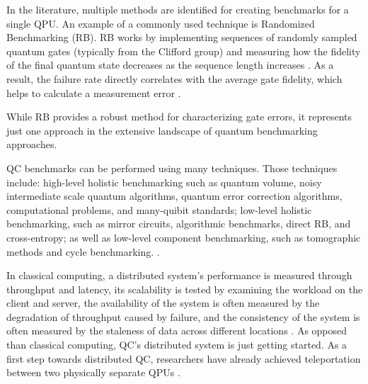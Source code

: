 
In the literature, multiple methods are identified for creating benchmarks for a single QPU. An example of a commonly used technique is Randomized Benchmarking (RB). RB works by implementing sequences of randomly sampled quantum gates (typically from the Clifford group) and measuring how the fidelity of the final quantum state decreases as the sequence length increases \cite{emersonScalableNoiseEstimation_2005}. As a result, the failure rate directly correlates with the average gate fidelity, which helps to calculate a measurement error \cite{magesanRobustRandomizedBenchmarking_2011}.

While RB provides a robust method for characterizing gate errors, it represents just one approach in the extensive landscape of quantum benchmarking approaches.

QC benchmarks can be performed using many techniques. Those techniques include: high-level holistic benchmarking such as quantum volume, noisy intermediate scale quantum algorithms, quantum error correction algorithms, computational problems, and many-quibit standards; low-level holistic benchmarking, such as mirror circuits, algorithmic benchmarks, direct RB, and cross-entropy; as well as low-level component benchmarking, such as tomographic methods and cycle benchmarking.  \cite{proctorBenchmarkingQuantumComputers2025_2025}.


In classical computing, a distributed system's performance is measured through throughput and latency, its scalability is tested by examining the workload on the client and server, the availability of the system is often measured by the degradation of throughput caused by failure, and the consistency of the system is often measured by the staleness of data across different locations \cite{andreoliniBenchmarkingModelsTools_2002}. As opposed than classical computing, QC's distributed system is just getting started. As a first step towards distributed QC, researchers have already achieved teleportation between two physically separate QPUs \cite{kangTeleportingTwoqubitEntanglementa_2025}. 



